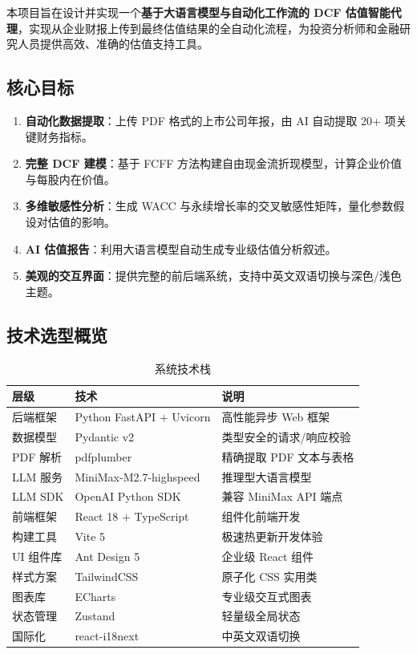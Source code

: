 \documentclass[12pt,a4paper]{article}
\begin{document}
本项目旨在设计并实现一个\textbf{基于大语言模型与自动化工作流的 DCF 估值智能代理}，实现从企业财报上传到最终估值结果的全自动化流程，为投资分析师和金融研究人员提供高效、准确的估值支持工具。

\subsection{核心目标}

\begin{enumerate}[leftmargin=2em]
  \item \textbf{自动化数据提取}：上传 PDF 格式的上市公司年报，由 AI 自动提取 20+ 项关键财务指标。
  \item \textbf{完整 DCF 建模}：基于 FCFF 方法构建自由现金流折现模型，计算企业价值与每股内在价值。
  \item \textbf{多维敏感性分析}：生成 WACC 与永续增长率的交叉敏感性矩阵，量化参数假设对估值的影响。
  \item \textbf{AI 估值报告}：利用大语言模型自动生成专业级估值分析叙述。
  \item \textbf{美观的交互界面}：提供完整的前后端系统，支持中英文双语切换与深色/浅色主题。
\end{enumerate}

\subsection{技术选型概览}

\begin{table}[H]
\centering
\caption{系统技术栈}
\label{tab:techstack}
\begin{tabular}{@{}lll@{}}
\toprule
\textbf{层级} & \textbf{技术} & \textbf{说明} \\
\midrule
后端框架  & Python FastAPI + Uvicorn & 高性能异步 Web 框架 \\
数据模型  & Pydantic v2            & 类型安全的请求/响应校验 \\
PDF 解析  & pdfplumber             & 精确提取 PDF 文本与表格 \\
LLM 服务  & MiniMax-M2.7-highspeed & 推理型大语言模型 \\
LLM SDK   & OpenAI Python SDK      & 兼容 MiniMax API 端点 \\
前端框架  & React 18 + TypeScript  & 组件化前端开发 \\
构建工具  & Vite 5                 & 极速热更新开发体验 \\
UI 组件库 & Ant Design 5           & 企业级 React 组件 \\
样式方案  & TailwindCSS            & 原子化 CSS 实用类 \\
图表库    & ECharts                & 专业级交互式图表 \\
状态管理  & Zustand                & 轻量级全局状态 \\
国际化    & react-i18next          & 中英文双语切换 \\
\bottomrule
\end{tabular}
\end{table}
\end{document}
